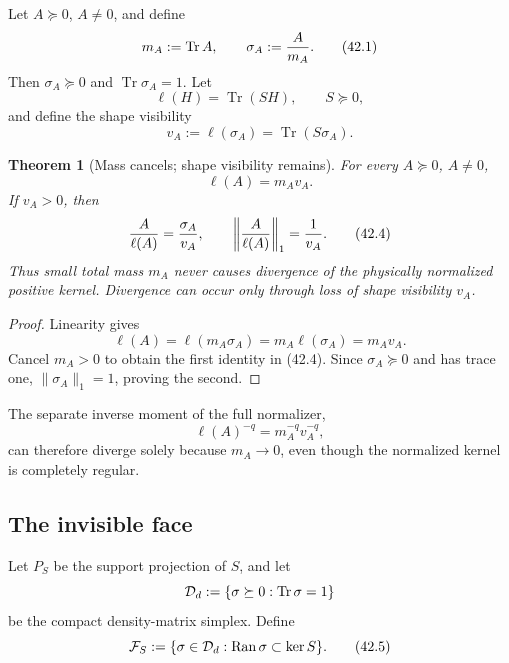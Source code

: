 \documentclass[11pt]{article}
\newtheorem{theorem}{Theorem}[section]
\theoremstyle{remark}
\begin{document}
Let \(A\succeq0\), \(A\ne0\), and define
\begin{equation}
 m_A:=\operatorname{Tr}A,\qquad
 \sigma_A:={A\over m_A}.                           \tag{42.1}
\end{equation}
Then \(\sigma_A\succeq0\) and
\(\operatorname{Tr}\sigma_A=1\).  Let
\[
 \ell(H)=\operatorname{Tr}(SH),\qquad S\succeq0,
\]
and define the shape visibility
\begin{equation}
 v_A:=\ell(\sigma_A)=\operatorname{Tr}(S\sigma_A).          \tag{42.2}
\end{equation}

\begin{theorem}[Mass cancels; shape visibility remains]
\label{thm:v12v42-mass-shape}
For every \(A\succeq0\), \(A\ne0\),
\begin{equation}
 \ell(A)=m_Av_A.                                  \tag{42.3}
\end{equation}
If \(v_A>0\), then
\begin{equation}
 {A\over\ell(A)}
 =
 {\sigma_A\over v_A},
 \qquad
 \left\|{A\over\ell(A)}\right\|_1
 =
 {1\over v_A}.                                   \tag{42.4}
\end{equation}
Thus small total mass \(m_A\) never causes divergence of the
physically normalized positive kernel.  Divergence can occur only
through loss of shape visibility \(v_A\).
\end{theorem}

\begin{proof}
Linearity gives
\[
 \ell(A)=\ell(m_A\sigma_A)=m_A\ell(\sigma_A)=m_Av_A.
\]
Cancel \(m_A>0\) to obtain the first identity in (42.4).
Since \(\sigma_A\succeq0\) and has trace one,
\(\|\sigma_A\|_1=1\), proving the second.
\end{proof}

The separate inverse moment of the full normalizer,
\[
 \ell(A)^{-q}=m_A^{-q}v_A^{-q},
\]
can therefore diverge solely because \(m_A\to0\), even though the
normalized kernel is completely regular.

\subsection{The invisible face}

Let \(P_S\) be the support projection of \(S\), and let
\[
 {\cal D}_d
 :=
 \{\sigma\succeq0:\operatorname{Tr}\sigma=1\}
\]
be the compact density-matrix simplex.  Define
\begin{equation}
 {\cal F}_S:=
 \{\sigma\in{\cal D}_d:
       \operatorname{Ran}\sigma\subset\ker S\}.    \tag{42.5}
\end{equation}
\end{document}
